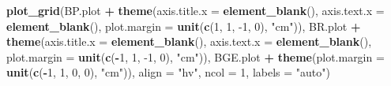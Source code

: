 \documentclass[]{article}
\newenvironment{Shaded}{\begin{snugshade}}{\end{snugshade}}
\newcommand{\DataTypeTok}[1]{\textcolor[rgb]{0.13,0.29,0.53}{#1}}
\newcommand{\DecValTok}[1]{\textcolor[rgb]{0.00,0.00,0.81}{#1}}
\newcommand{\KeywordTok}[1]{\textcolor[rgb]{0.13,0.29,0.53}{\textbf{#1}}}
\newcommand{\NormalTok}[1]{#1}
\newcommand{\OperatorTok}[1]{\textcolor[rgb]{0.81,0.36,0.00}{\textbf{#1}}}
\newcommand{\StringTok}[1]{\textcolor[rgb]{0.31,0.60,0.02}{#1}}
\begin{document}
\begin{Shaded}
\begin{Highlighting}[]
\KeywordTok{plot_grid}\NormalTok{(BP.plot }\OperatorTok{+}\StringTok{ }\KeywordTok{theme}\NormalTok{(}\DataTypeTok{axis.title.x =} \KeywordTok{element_blank}\NormalTok{(), }\DataTypeTok{axis.text.x =} \KeywordTok{element_blank}\NormalTok{(), }
                          \DataTypeTok{plot.margin =} \KeywordTok{unit}\NormalTok{(}\KeywordTok{c}\NormalTok{(}\DecValTok{1}\NormalTok{, }\DecValTok{1}\NormalTok{, }\DecValTok{-1}\NormalTok{, }\DecValTok{0}\NormalTok{), }\StringTok{"cm"}\NormalTok{)), }
\NormalTok{          BR.plot }\OperatorTok{+}\StringTok{ }\KeywordTok{theme}\NormalTok{(}\DataTypeTok{axis.title.x =} \KeywordTok{element_blank}\NormalTok{(), }\DataTypeTok{axis.text.x =} \KeywordTok{element_blank}\NormalTok{(),}
                          \DataTypeTok{plot.margin =} \KeywordTok{unit}\NormalTok{(}\KeywordTok{c}\NormalTok{(}\OperatorTok{-}\DecValTok{1}\NormalTok{, }\DecValTok{1}\NormalTok{, }\DecValTok{-1}\NormalTok{, }\DecValTok{0}\NormalTok{), }\StringTok{"cm"}\NormalTok{)), }
\NormalTok{          BGE.plot }\OperatorTok{+}\StringTok{ }\KeywordTok{theme}\NormalTok{(}\DataTypeTok{plot.margin =} \KeywordTok{unit}\NormalTok{(}\KeywordTok{c}\NormalTok{(}\OperatorTok{-}\DecValTok{1}\NormalTok{, }\DecValTok{1}\NormalTok{, }\DecValTok{0}\NormalTok{, }\DecValTok{0}\NormalTok{), }\StringTok{"cm"}\NormalTok{)), }
          \DataTypeTok{align =} \StringTok{"hv"}\NormalTok{, }\DataTypeTok{ncol =} \DecValTok{1}\NormalTok{, }\DataTypeTok{labels =} \StringTok{"auto"}\NormalTok{)}
\end{Highlighting}
\end{Shaded}
\end{document}
